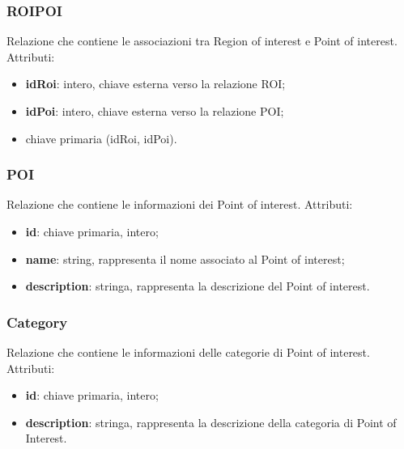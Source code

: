 \documentclass[../ManualeSviluppatore.tex]{subfiles}
\begin{document}
		\subsubsection{ROIPOI}
		Relazione che contiene le associazioni tra Region of interest e Point of interest. Attributi:
			\begin{itemize}
			\item \textbf{idRoi}: intero, chiave esterna verso la relazione \gls{ROI};
			\item \textbf{idPoi}: intero, chiave esterna verso la relazione \gls{POI};
			\item chiave primaria (idRoi, idPoi).
			\end{itemize}
		\subsubsection{POI}
		Relazione che contiene le informazioni dei Point of interest. Attributi:
			\begin{itemize}
			\item \textbf{id}: chiave primaria, intero;
			\item \textbf{name}: string, rappresenta il nome associato al Point of interest;
			\item \textbf{description}: stringa, rappresenta la descrizione del Point of interest.
			\end{itemize}
		\subsubsection{Category}
		Relazione che contiene le informazioni delle categorie di Point of interest. Attributi:
			\begin{itemize}
			\item \textbf{id}: chiave primaria, intero;
			\item \textbf{description}: stringa, rappresenta la descrizione della categoria di Point of Interest.
			\end{itemize}
\end{document}
